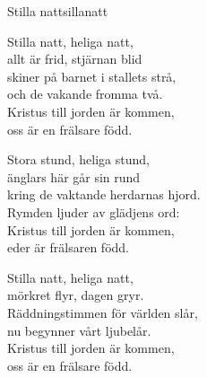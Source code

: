 \begin{song}{Stilla natt}{sillanatt}
\begin{vers}
Stilla natt, heliga natt,\\
allt är frid, stjärnan blid\\
skiner på barnet i stallets strå,\\
och de vakande fromma två.\\
Kristus till jorden är kommen,\\
oss är en frälsare född.\\
\end{vers}
\begin{vers}
Stora stund, heliga stund,\\
änglars här går sin rund\\
kring de vaktande herdarnas hjord.\\
Rymden ljuder av glädjens ord:\\
Kristus till jorden är kommen,\\
eder är frälsaren född.\\
\end{vers}
\begin{vers}
Stilla natt, heliga natt,\\
mörkret flyr, dagen gryr.\\
Räddningstimmen för världen slår,\\
nu begynner vårt ljubelår.\\
Kristus till jorden är kommen,\\
oss är en frälsare född.\\
\end{vers}
\end{song}

\newpage

